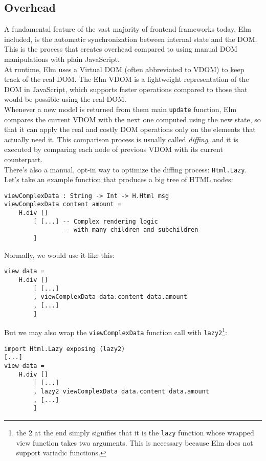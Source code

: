 \subsection{Overhead}
A fundamental feature of the vast majority of frontend frameworks today, Elm included, is the automatic synchronization between internal state and the DOM. This is the process that creates overhead compared to using manual DOM manipulations with plain JavaScript.\\

At runtime, Elm uses a Virtual DOM (often abbreviated to VDOM) to keep track of the real DOM. The Elm VDOM is a lightweight representation of the DOM in JavaScript, which supports faster operations compared to those that would be possible using the real DOM. \cite{noauthor_htmllazy_nodate}\\

Whenever a new model is returned from them main \texttt{update} function, Elm compares the current VDOM with the next one computed using the new state, so that it can apply the real and costly DOM operations only on the elements that actually need it. This comparison process is usually called \textit{diffing}, and it is executed by comparing each node of previous VDOM with its current counterpart.\\

There's also a manual, opt-in way to optimize the diffing process: \texttt{Html.Lazy}. Let's take an example function that produces a big tree of HTML nodes:
\begin{verbatim}
viewComplexData : String -> Int -> H.Html msg
viewComplexData content amount =
    H.div []
        [ [...] -- Complex rendering logic 
                -- with many children and subchildren
        ]
\end{verbatim}

Normally, we would use it like this:
\begin{verbatim}
view data =
    H.div []
        [ [...]
        , viewComplexData data.content data.amount
        , [...]
        ]
\end{verbatim}

But we may also wrap the \texttt{viewComplexData} function call with \texttt{lazy2}\footnote[1]{the 2 at the end simply signifies that it is the \texttt{lazy} function whose wrapped view function takes two arguments. This is necessary because Elm does not support variadic functions.}:
\begin{verbatim}
import Html.Lazy exposing (lazy2)
[...]
view data =
    H.div []
        [ [...]
        , lazy2 viewComplexData data.content data.amount
        , [...]
        ]
\end{verbatim}


